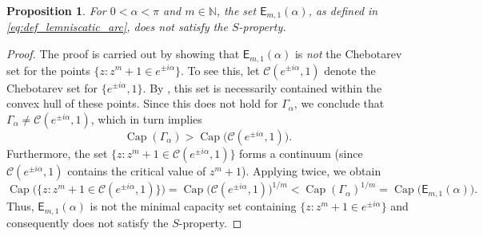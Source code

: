 \documentclass[12pt,oneside,reqno]{amsart}
\newtheorem{proposition}[theorem]{Proposition}
\theoremstyle{definition}
\numberwithin{equation}{section}
\newcommand{\N}{{\mathbb N}}
\newcommand{\E}{{\mathsf E}}
\renewcommand{\Cap}{\operatorname{Cap}}
\begin{document}
\begin{proposition}
\label{prop:no_s_property}
For $0<\alpha<\pi$ and $m\in \N$, the set $\E_{m,1}(\alpha)$, as defined in \eqref{eq:def_lemniscatic_arc}, does not satisfy the $S$-property.
\end{proposition}
\begin{proof}
The proof is carried out by showing that $\E_{m,1}(\alpha)$ is \emph{not} the Chebotarev set for the points $\{z:z^m+1\in e^{\pm i\alpha}\}$. %
To see this, let $\mathcal{C}(e^{\pm i\alpha}, 1)$ denote the Chebotarev set for $\{e^{\pm i\alpha}, 1\}$. By \cite[Theorem 1.2]{kuzmina80}, this set is necessarily contained within the convex hull of these points. Since this does not hold for $\Gamma_\alpha$, we conclude that $\Gamma_\alpha\neq \mathcal{C}(e^{\pm i\alpha},1)$, which in turn implies 
\[
\Cap(\Gamma_\alpha)>\Cap\bigl(\mathcal{C}(e^{\pm i\alpha},1)\bigr).
\] 
Furthermore, the set $\{z: z^m+1\in \mathcal{C}(e^{\pm i\alpha}, 1)\}$ forms a continuum (since $\mathcal{C}(e^{\pm i\alpha}, 1)$ contains the critical value of $z^m+1$). Applying \cite[Theorem 5.2.5]{ransford95} twice, we obtain
\[
\Cap\bigl(\{z:z^m+1\in \mathcal{C}(e^{\pm i\alpha},1)\}\bigr) = 
\Cap\bigl(\mathcal{C}(e^{\pm i\alpha},1)\bigr)^{1/m} < 
\Cap(\Gamma_\alpha)^{1/m} = 
\Cap\bigl(\E_{m,1}(\alpha)\bigr).
\]
Thus, \(\E_{m,1}(\alpha)\) is not the minimal capacity set containing \(\{z:z^m+1\in e^{\pm i\alpha}\}\) and consequently does not satisfy the $S$-property.
\end{proof}
\end{document}
